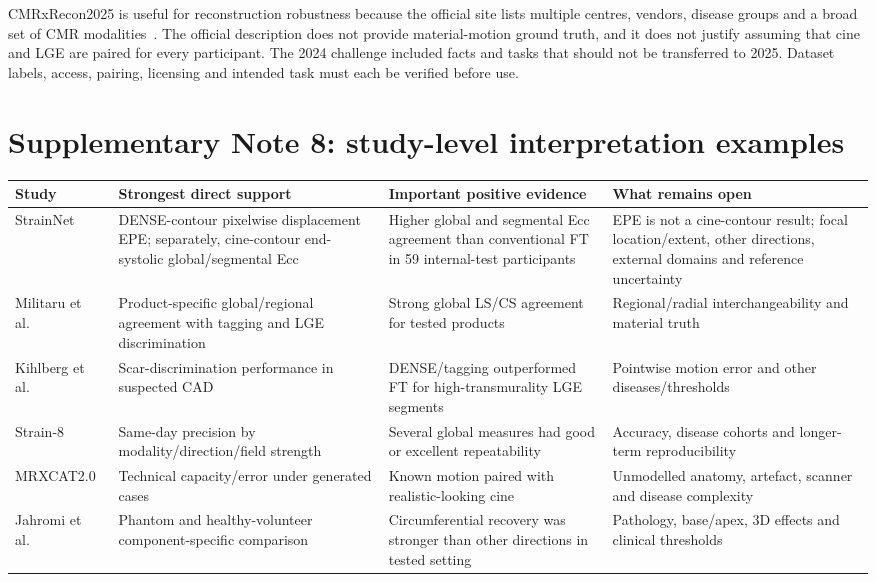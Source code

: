 \documentclass[11pt,a4paper]{article}
\begin{document}
CMRxRecon2025 is useful for reconstruction robustness because the official site lists multiple centres, vendors, disease groups and a broad set of CMR modalities~\cite{cmrxrecon2025official}. The official description does not provide material-motion ground truth, and it does not justify assuming that cine and LGE are paired for every participant. The 2024 challenge included facts and tasks that should not be transferred to 2025. Dataset labels, access, pairing, licensing and intended task must each be verified before use.

\section*{Supplementary Note 8: study-level interpretation examples}

{\small
\setlength{\tabcolsep}{3pt}
\begin{longtable}{L{0.183\textwidth}L{0.226\textwidth}L{0.259\textwidth}L{0.269\textwidth}}
\toprule
Study & Strongest direct support & Important positive evidence & What remains open \\
\midrule
StrainNet~\cite{wang2023strainnet} & DENSE-contour pixelwise displacement EPE; separately, cine-contour end-systolic global/segmental Ecc & Higher global and segmental Ecc agreement than conventional FT in 59 internal-test participants & EPE is not a cine-contour result; focal location/extent, other directions, external domains and reference uncertainty \\
\addlinespace
Militaru et al.~\cite{militaru2021} & Product-specific global/regional agreement with tagging and LGE discrimination & Strong global LS/CS agreement for tested products & Regional/radial interchangeability and material truth \\
\addlinespace
Kihlberg et al.~\cite{kihlberg2020clinical} & Scar-discrimination performance in suspected CAD & DENSE/tagging outperformed FT for high-transmurality LGE segments & Pointwise motion error and other diseases/thresholds \\
\addlinespace
Strain-8~\cite{bell2025strain8} & Same-day precision by modality/direction/field strength & Several global measures had good or excellent repeatability & Accuracy, disease cohorts and longer-term reproducibility \\
\addlinespace
MRXCAT2.0~\cite{mrxcat2023} & Technical capacity/error under generated cases & Known motion paired with realistic-looking cine & Unmodelled anatomy, artefact, scanner and disease complexity \\
\addlinespace
Jahromi et al.~\cite{jahromi2026densecine} & Phantom and healthy-volunteer component-specific comparison & Circumferential recovery was stronger than other directions in tested setting & Pathology, base/apex, 3D effects and clinical thresholds \\
\bottomrule
\end{longtable}
}
\end{document}
